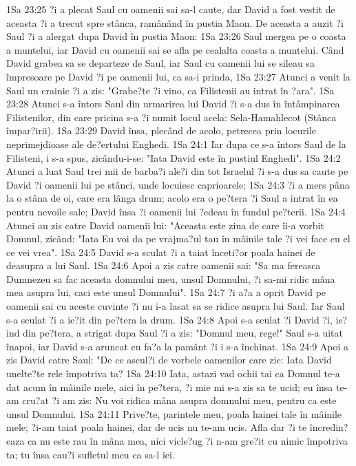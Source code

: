 1Sa 23:25  ?i a plecat Saul cu oamenii sai sa-l caute, dar David a fost vestit de aceasta ?i a trecut spre stânca, ramânând în pustia Maon. De aceasta a auzit ?i Saul ?i a alergat dupa David în pustia Maon:
1Sa 23:26  Saul mergea pe o coasta a muntelui, iar David cu oamenii sai se afla pe cealalta coasta a muntelui. Când David grabea sa se departeze de Saul, iar Saul cu oamenii lui se sileau sa împresoare pe David ?i pe oamenii lui, ca sa-i prinda,
1Sa 23:27  Atunci a venit la Saul un crainic ?i a zis: "Grabe?te ?i vino, ca Filistenii au intrat în ?ara".
1Sa 23:28  Atunci s-a întors Saul din urmarirea lui David ?i s-a dus în întâmpinarea Filistenilor, din care pricina s-a ?i numit locul acela: Sela-Hamahlecot (Stânca împar?irii).
1Sa 23:29  David însa, plecând de acolo, petrecea prin locurile neprimejdioase ale de?ertului Enghedi.
1Sa 24:1  Iar dupa ce s-a întors Saul de la Filisteni, i s-a spus, zicându-i-se: "Iata David este în pustiul Enghedi".
1Sa 24:2  Atunci a luat Saul trei mii de barba?i ale?i din tot Israelul ?i s-a dus sa caute pe David ?i oamenii lui pe stânci, unde locuiesc caprioarele;
1Sa 24:3  ?i a mers pâna la o stâna de oi, care era lânga drum; acolo era o pe?tera ?i Saul a intrat în ea pentru nevoile sale; David însa ?i oamenii lui ?edeau în fundul pe?terii.
1Sa 24:4  Atunci au zis catre David oamenii lui: "Aceasta este ziua de care îi-a vorbit Domnul, zicând: "Iata Eu voi da pe vrajma?ul tau în mâinile tale ?i vei face cu el ce vei vrea".
1Sa 24:5  David s-a sculat ?i a taiat înceti?or poala hainei de deasupra a lui Saul.
1Sa 24:6  Apoi a zis catre oamenii sai: "Sa ma fereasca Dumnezeu sa fac aceasta domnului meu, unsul Domnului, ?i sa-mi ridic mâna mea asupra lui, caci este unsul Domnului".
1Sa 24:7  ?i a?a a oprit David pe oamenii sai cu aceste cuvinte ?i nu i-a lasat sa se ridice asupra lui Saul. Iar Saul s-a sculat ?i a ie?it din pe?tera la drum.
1Sa 24:8  Apoi s-a sculat ?i David ?i, ie?ind din pe?tera, a strigat dupa Saul ?i a zis: "Domnul meu, rege!" Saul s-a uitat înapoi, iar David s-a aruncat cu fa?a la pamânt ?i i s-a închinat.
1Sa 24:9  Apoi a zis David catre Saul: "De ce ascul?i de vorbele oamenilor care zic: Iata David unelte?te rele împotriva ta?
1Sa 24:10  Iata, astazi vad ochii tai ca Domnul te-a dat acum în mâinile mele, aici în pe?tera, ?i mie mi s-a zis sa te ucid; eu însa te-am cru?at ?i am zis: Nu voi ridica mâna asupra domnului meu, pentru ca este unsul Domnului.
1Sa 24:11  Prive?te, parintele meu, poala hainei tale în mâinile mele; ?i-am taiat poala hainei, dar de ucis nu te-am ucis. Afla dar ?i te încredin?eaza ca nu este rau în mâna mea, nici vicle?ug ?i n-am gre?it cu nimic împotriva ta; tu însa cau?i sufletul meu ca sa-l iei.

